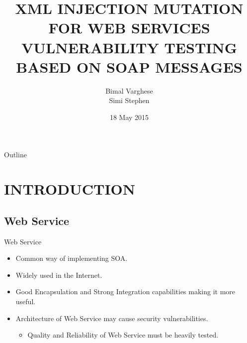 \documentclass{bredelebeamer}
\title[Mini Project]{ XML INJECTION MUTATION FOR WEB SERVICES
	VULNERABILITY TESTING BASED ON SOAP
	MESSAGES}
\author{Bimal Varghese \\ %
		Simi Stephen  }%
\institute[FISAT Mookkannoor]
{
  Federal Institute of Science and Technology \\
  Mookkannoor \\
  Angamaly
  }
\date{18 May 2015}
\begin{document}
\begin{frame}
  \titlepage
\end{frame}





\begin{frame}{Outline}
  \tableofcontents
\end{frame}




\section{INTRODUCTION}

\begin{frame}
\end{frame}

\subsection{Web Service}
\begin{frame}{Web Service}
	\large
	 \begin{itemize}
	 	\item Common way of implementing SOA.
	 	\newline
	 	
	 	\item Widely used in the Internet. 
	 	\newline
	 	\item Good Encapsulation and Strong Integration capabilities making it more useful.
	 	\newline
	 	\item Architecture of Web Service may cause security vulnerabilities.
	 	\newline
	 	\begin{itemize}
	 		\large
	 		\item Quality and Reliability of Web Service must be heavily tested.
	 	\end{itemize}
	  	
	 \end{itemize}
\end{frame}
\end{document}
